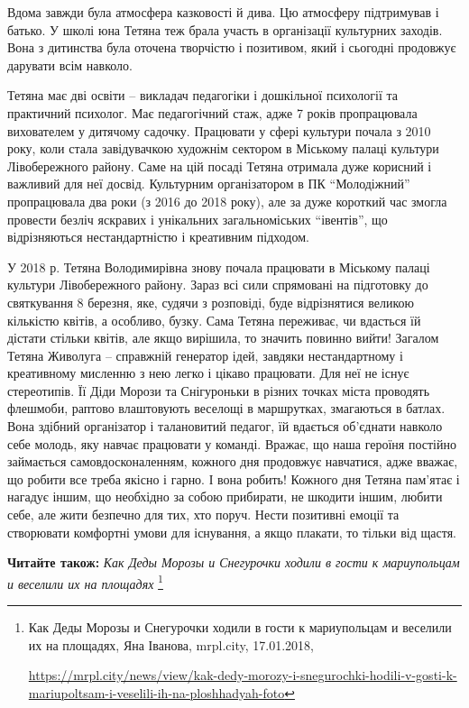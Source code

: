 
Вдома завжди була атмосфера казковості й дива. Цю атмосферу підтримував і
батько. У школі юна Тетяна теж брала участь в організації культурних заходів.
Вона з дитинства була оточена творчістю і позитивом, який і сьогодні продовжує
дарувати всім навколо.

Тетяна має дві освіти – викладач педагогіки і дошкільної психології та
практичний психолог. Має педагогічний стаж, адже 7 років пропрацювала
вихователем у дитячому садочку. Працювати у сфері культури почала з 2010 року,
коли стала завідувачкою художнім сектором в Міському палаці культури
Лівобережного району. Саме на цій посаді Тетяна отримала дуже корисний і
важливий для неї досвід. Культурним організатором в ПК \enquote{Молодіжний}
пропрацювала два роки (з 2016 до 2018 року), але за дуже короткий час змогла
провести безліч яскравих і унікальних загальноміських \enquote{івентів}, що
відрізняються нестандартністю і креативним підходом.


У 2018 р. Тетяна Володимирівна знову почала працювати в Міському палаці
культури Лівобережного району. Зараз всі сили спрямовані на підготовку до
святкування 8 березня, яке, судячи з розповіді, буде відрізнятися великою
кількістю квітів, а особливо, бузку. Сама Тетяна переживає, чи вдасться їй
дістати стільки квітів, але якщо вирішила, то значить повинно вийти! Загалом
Тетяна Живолуга – справжній генератор ідей, завдяки нестандартному і
креативному мисленню з нею легко і цікаво працювати. Для неї не існує
стереотипів. Її Діди Морози та Снігуроньки в різних точках міста проводять
флешмоби, раптово влаштовують веселощі в маршрутках, змагаються в батлах. Вона
здібний організатор і талановитий педагог, їй вдається об'єднати навколо себе
молодь, яку навчає працювати у команді. Вражає, що наша героїня постійно
займається самовдосконаленням, кожного дня продовжує навчатися, адже вважає, що
робити все треба якісно і гарно. І вона робить! Кожного дня Тетяна пам'ятає і
нагадує іншим, що необхідно за собою прибирати, не шкодити іншим, любити себе,
але жити безпечно для тих, хто поруч. Нести позитивні емоції та створювати
комфортні умови для існування, а якщо плакати, то тільки від щастя.

\textbf{Читайте також:} \emph{Как Деды Морозы и Снегурочки ходили в гости к мариупольцам и веселили их на площадях}%
\footnote{Как Деды Морозы и Снегурочки ходили в гости к мариупольцам и веселили их на площадях, Яна Іванова, mrpl.city, 17.01.2018, \par%
\url{https://mrpl.city/news/view/kak-dedy-morozy-i-snegurochki-hodili-v-gosti-k-mariupoltsam-i-veselili-ih-na-ploshhadyah-foto}
}

